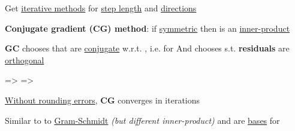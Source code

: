 Get \underline{iterative methods}
for \underline{step length}  and \underline{directions} 

\hSep %

\textbf{Conjugate gradient (CG) method}: if  \underline{symmetric} then
is an \underline{inner-product}
\begin{itemize}

      \vItem
            \textbf{GC} chooses  that are \underline{conjugate}
            w.r.t. ,
            i.e. 
            for 
      \vItem
            And chooses  s.t. \textbf{residuals}
            are \underline{orthogonal}

            \begin{itemize}

                  \vItem
                         =>
                  \vItem
                         =>
                  \vItem
            \end{itemize}
      \vItem
            \underline{Without rounding errors}, \textbf{CG} converges in  iterations
            \tcbbreak

            \begin{itemize}

                  \vItem
                        Similar to to \underline{Gram-Schmidt} \emph{(but different inner-product)}
                  \vItem
                         and
                        are \underline{bases} for 
            \end{itemize}
\end{itemize}


